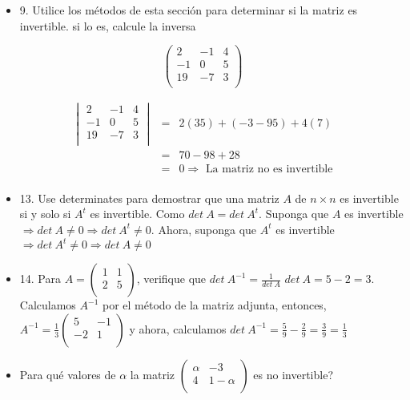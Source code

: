 \documentclass[
]{article}
\begin{document}
\begin{itemize}
\item
  9. Utilice los métodos de esta sección para determinar si la matriz es
  invertible. si lo es, calcule la inversa
\end{itemize}

\[\begin{pmatrix}
2 & - 1 & 4 \\
 - 1 & 0 & 5 \\
19 & - 7 & 3 \\
\end{pmatrix}\]

\[\begin{matrix}
\begin{vmatrix}
2 & - 1 & 4 \\
 - 1 & 0 & 5 \\
19 & - 7 & 3 \\
\end{vmatrix} & = & 2(35) + ( - 3 - 95) + 4(7) \\
 & = & 70 - 98 + 28 \\
 & = & 0 \Rightarrow \mathrm{\text{\ La\ matriz\ no\ es\ invertible}} \\
\end{matrix}\]

\begin{itemize}
\item
  13. Use determinates para demostrar que una matriz \(A\) de
  \(n \times n\) es invertible si y solo si \(A^{t}\) es invertible.
  Como \(det\ A = det\ A^{t}\). Suponga que \(A\) es invertible
  \(\Rightarrow det\ A \neq 0 \Rightarrow det\ A^{t} \neq 0\). Ahora,
  suponga que \(A^{t}\) es invertible
  \(\Rightarrow det\ A^{t} \neq 0 \Rightarrow det\ A \neq 0\)
\item
  14. Para \(A = \begin{pmatrix}
  1 & 1 \\
  2 & 5 \\
  \end{pmatrix}\), verifique que \(det\ A^{- 1} = \frac{1}{det\ A}\)
  \(det\ A = 5 - 2 = 3\). Calculamos \(A^{- 1}\) por el método de la
  matriz adjunta, entonces, \(A^{- 1} = \frac{1}{3}\begin{pmatrix}
  5 & - 1 \\
   - 2 & 1 \\
  \end{pmatrix}\) y ahora, calculamos
  \(det\ A^{- 1} = \frac{5}{9} - \frac{2}{9} = \frac{3}{9} = \frac{1}{3}\)
\item
  Para qué valores de \(\alpha\) la matriz \(\begin{pmatrix}
  \alpha & - 3 \\
  4 & 1 - \alpha \\
  \end{pmatrix}\) es no invertible?
\end{itemize}
\end{document}
